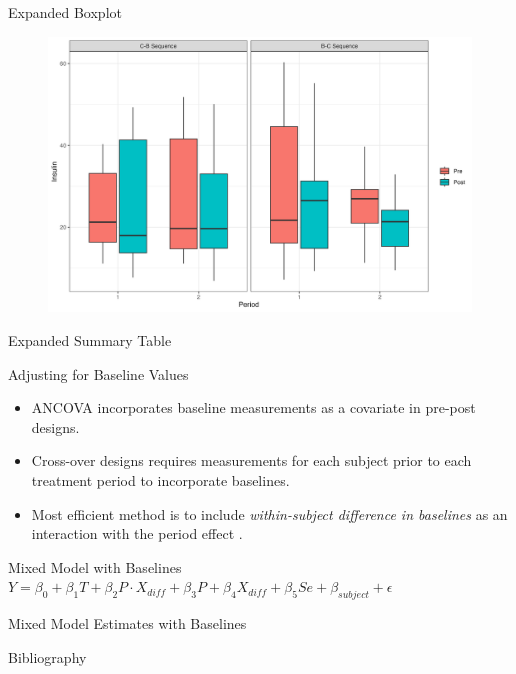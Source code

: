 \documentclass{beamer}
\begin{document}
\begin{frame}{Expanded Boxplot}
    \begin{figure}
        \centering
        \includegraphics[width=\linewidth]{report/figures/ch3/proteinBoxplot.png}
    \end{figure}
\end{frame}

\begin{frame}{Expanded Summary Table}
    
\end{frame}

\begin{frame}{Adjusting for Baseline Values}
    \begin{itemize}
        \item ANCOVA incorporates baseline measurements as a covariate in pre-post designs.
        \item Cross-over designs requires measurements for each subject prior to each treatment period to incorporate baselines.
        \item Most efficient method is to include \textit{within-subject difference in baselines} as an interaction with the period effect \cite{mehrotra2014}.
    \end{itemize}
    \begin{block}{Mixed Model with Baselines}
        $Y = \beta_0 + \beta_1 T + \beta_2 P \cdot X_{diff} + \beta_3 P + \beta_4 X_{diff} + \beta_5 Se + \beta_{subject} + \epsilon$
    \end{block}
\end{frame}

\begin{frame}{Mixed Model Estimates with Baselines}
    
\end{frame}

\begin{frame}{Bibliography}
    
    
\end{frame}
\end{document}
